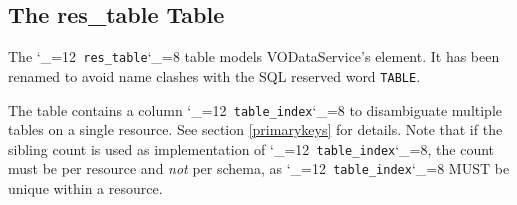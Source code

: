\documentclass[11pt,a4paper]{ivoa}
\makeatletter
\def\rtent#1{\texttt{\color{rtcolor}\verb|#1|}}
\def\makeunderscoreletter{\catcode`\_=12}
\def\makeunderscoresubscript{\catcode`\_=8}
\def\rtent{\makeunderscoreletter\relax\rt@nt}
\def\rt@nt#1{\texttt{\color{rtcolor} #1}\makeunderscoresubscript{}}
\makeatother
\begin{document}
\subsection{The res\_table Table}

\label{table_res_table}

The \rtent{res_table} table models VODataService's
 element.  It has been renamed to avoid name clashes
with the SQL reserved word \texttt{TABLE}.

The table contains a column \rtent{table_index} to disambiguate
multiple tables on a single resource.  See section \ref{primarykeys} for details.  Note that if the sibling
count is used as implementation of \rtent{table_index}, the count
must be per resource and \emph{not} per schema, as
\rtent{table_index} MUST be unique within a resource.


\end{document}

